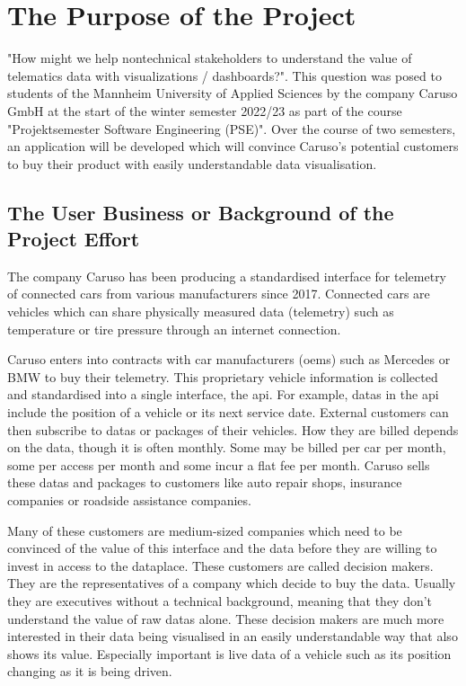 \chapter{The Purpose of the Project}
"How might we help \gls{nontechnical} \glspl{stakeholder} to understand the value of telematics data with visualizations / dashboards?". This question was posed to students of the Mannheim University of Applied Sciences by the company Caruso GmbH at the start of the winter semester 2022/23 as part of the course "Projektsemester Software Engineering (PSE)". Over the course of two semesters, an application will be developed which will convince Caruso's potential customers to buy their product with easily understandable data visualisation.

\section{The User Business or Background of the Project Effort}
The company Caruso has been producing a standardised interface for \gls{telemetry} of connected cars from various manufacturers since 2017. Connected cars are vehicles which can share physically measured data (\gls{telemetry}) such as temperature or tire pressure through an internet connection.

Caruso enters into contracts with car manufacturers (\glspl{oem}) such as Mercedes or BMW to buy their \gls{telemetry}. This proprietary vehicle information is collected and standardised into a single interface, the \gls{api}. For example, \glspl{data} in the \gls{api} include the position of a vehicle or its next service date. External customers can then subscribe to \glspl{data} or packages of their vehicles. How they are billed depends on the \gls{data}, though it is often monthly. Some may be billed per car per month, some per access per month and some incur a flat fee per month. Caruso sells these \glspl{data} and packages to customers like auto repair shops, insurance companies or roadside assistance companies. 

Many of these customers are medium-sized companies which need to be convinced of the value of this interface and the data before they are willing to invest in access to the \gls{dataplace}. These customers are called decision makers. They are the representatives of a company which decide to buy the data. Usually they are executives without a technical background, meaning that they don't understand the value of raw \glspl{data} alone. These decision makers are much more interested in their data being visualised in an easily understandable way that also shows its value. Especially important is live data of a vehicle such as its position changing as it is being driven.

